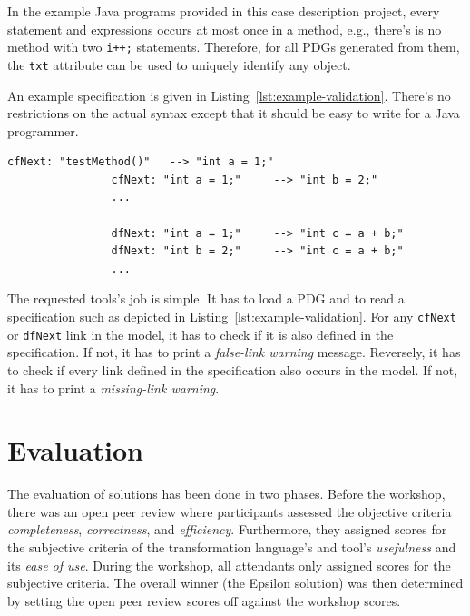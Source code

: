 \documentclass[submission]{eptcs}
\begin{document}
In the example Java programs provided in this case description project, every
statement and expressions occurs at most once in a method, e.g., there's is no
method with two \verb|i++;| statements.  Therefore, for all PDGs generated from
them, the \verb|txt| attribute can be used to uniquely identify any object.

An example specification is given in Listing~\ref{lst:example-validation}.
There's no restrictions on the actual syntax except that it should be easy to
write for a Java programmer.

\begin{lstlisting}[caption={An example validation DSL for result PDGs},label={lst:example-validation}]
                cfNext: "testMethod()"   --> "int a = 1;"
                cfNext: "int a = 1;"     --> "int b = 2;"
                ...

                dfNext: "int a = 1;"     --> "int c = a + b;"
                dfNext: "int b = 2;"     --> "int c = a + b;"
                ...
\end{lstlisting}

The requested tools's job is simple.  It has to load a PDG and to read a
specification such as depicted in Listing~\ref{lst:example-validation}.  For
any \verb|cfNext| or \verb|dfNext| link in the model, it has to check if it is
also defined in the specification.  If not, it has to print a \emph{false-link
  warning} message.  Reversely, it has to check if every link defined in the
specification also occurs in the model.  If not, it has to print a
\emph{missing-link warning}.


\section{Evaluation}
\label{sec:evaluation-criteria}

The evaluation of solutions has been done in two phases.  Before the workshop,
there was an open peer review where participants assessed the objective
criteria \emph{completeness}, \emph{correctness}, and \emph{efficiency}.
Furthermore, they assigned scores for the subjective criteria of the
transformation language's and tool's \emph{usefulness} and its \emph{ease of
  use}.  During the workshop, all attendants only assigned scores for the
subjective criteria.  The overall winner (the Epsilon solution) was then
determined by setting the open peer review scores off against the workshop
scores.



\end{document}
